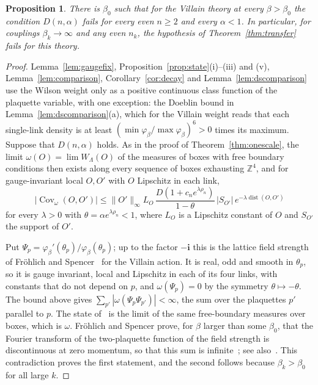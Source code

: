 \documentclass[11pt]{amsart}
\newtheorem{proposition}[theorem]{Proposition}
\theoremstyle{definition}
\theoremstyle{remark}
\numberwithin{equation}{section}
\newcommand{\Z}{\mathbb{Z}}
\newcommand{\Cov}{\operatorname{Cov}}
\newcommand{\dist}{\operatorname{dist}}
\begin{document}
\begin{proposition}\label{prop:coulomb}
There is $\beta_0$ such that for the Villain theory at every $\beta>\beta_0$
the condition $D(n,\alpha)$ fails for every even $n\ge2$ and every
$\alpha<1$. In particular, for couplings $\beta_k\to\infty$ and any even
$n_k$, the hypothesis of Theorem~\ref{thm:transfer} fails for this theory.
\end{proposition}

\begin{proof}
Lemma~\ref{lem:gaugefix}, Proposition~\ref{prop:state}(i)--(iii) and (v),
Lemma~\ref{lem:comparison}, Corollary~\ref{cor:decay} and
Lemma~\ref{lem:dscomparison} use the Wilson weight only as a positive
continuous class function of the plaquette variable, with one exception:
the Doeblin bound in Lemma~\ref{lem:dscomparison}(a), which for the Villain
weight reads that each single-link density is at least
$(\min\varphi_\beta/\max\varphi_\beta)^6>0$ times its maximum. Suppose that
$D(n,\alpha)$ holds. As in the proof of Theorem~\ref{thm:onescale}, the limit
$\omega(O)=\lim W_\Lambda(O)$ of the measures of boxes with free boundary
conditions then exists along every sequence of boxes exhausting $\Z^4$, and
for gauge-invariant local $O,O'$ with $O$ Lipschitz in each link,
\[
|\Cov_\omega(O,O')|\le\|O'\|_\infty L_O\,
\frac{D(1+c_ne^{\lambda\rho_n})}{1-\theta}\,|S_{O'}|\,
e^{-\lambda\dist(O,O')}
\]
for every $\lambda>0$ with $\theta=\alpha e^{\lambda\rho_n}<1$, where $L_O$
is a Lipschitz constant of $O$ and $S_{O'}$ the support of $O'$.

Put $\Psi_p=\varphi_\beta'(\theta_p)/\varphi_\beta(\theta_p)$; up to the factor
$-\mathbf i$ this is the lattice field strength of Fr\"ohlich and
Spencer~\cite[Sect.~2]{FS82} for the Villain action. It is real, odd and
smooth in $\theta_p$, so it is gauge invariant, local and Lipschitz in each
of its four links, with constants that do not depend on $p$, and
$\omega(\Psi_p)=0$ by the symmetry $\theta\mapsto-\theta$. The bound above
gives $\sum_{p'}|\omega(\Psi_p\Psi_{p'})|<\infty$, the sum over the
plaquettes $p'$ parallel to $p$. The state of~\cite{FS82} is the limit of
the same free-boundary measures over boxes, which is $\omega$. Fr\"ohlich
and Spencer prove, for $\beta$ larger than some $\beta_0$, that the Fourier
transform of the two-plaquette function of the field strength is
discontinuous at zero momentum, so that this sum is
infinite~\cite[Sect.~2]{FS82}; see also~\cite{Gut80}. This contradiction
proves the first statement, and the second follows because $\beta_k>\beta_0$
for all large $k$.
\end{proof}
\end{document}

